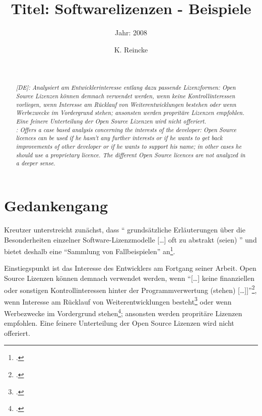 \documentclass[DIV=calc,BCOR=5mm,11pt,headings=small,oneside,abstract=true, toc=bib]{scrartcl}
\begin{document}

\titlehead{Literaturexzerpt}
\subject{Autor(en): Kreutzer}
\title{Titel: Softwarelizenzen - Beispiele}
\subtitle{Jahr: 2008 }
\author{K. Reincke}
\maketitle

\begin{abstract}
\noindent
\cite[(in:)][]{DjoGehGraKreSpi2008a} \\
\noindent
\cite[(ist:)][176 - 179]{Kreutzer2008c} \\
\noindent \itshape
[DE]:  Analysiert am Entwicklerinteresse entlang dazu passende Lizenzformen:
Open Source Lizenzen können demnach verwendet werden, wenn keine
Kontrollinteressen vorliegen, wenn Interesse am Rücklauf von
Weiterentwicklungen bestehen oder wenn Werbezwecke im Vordergrund stehen;
ansonsten werden propritäre Lizenzen empfohlen. Eine feinere Unterteilung der
Open Source Lizenzen wird nicht offeriert. \\
\noindent
[EN]: Offers a case based analysis concerning the interests of the developer:
Open Source licences can be used if he hasn't any further interests or if he
wants to get back improvements of other developer or if he wants to support his
name; in other cases he should use a proprietary licence. The different Open
Source licences are not analyzed in a deeper sense.
\end{abstract}
\footnotesize
\normalsize

\section{Gedankengang}

Kreutzer unterstreicht zunächst, dass \enquote{ grundsätzliche Erläuterungen über
die Besonderheiten einzelner Software-Lizenzmodelle [\ldots] oft zu abstrakt
(seien) } und bietet deshalb eine \enquote{Sammlung von
Fallbeispielen} an\footcite[vgl.][176ff]{Kreutzer2008c}.

Einstiegspunkt ist das Interesse des Entwicklers am Fortgang seiner Arbeit. Open
Source Lizenzen können demnach verwendet werden, wenn \enquote{[\ldots] keine
finanziellen oder sonstigen Kontrollinteressen hinter der Programmverwertung
(stehen) [\ldots]]}\footcite[vgl.][176]{Kreutzer2008c}, wenn Interesse am
Rücklauf von Weiterentwicklungen besteht\footcite[vgl.][177]{Kreutzer2008c} oder
wenn Werbezwecke im Vordergrund stehen\footcite[vgl.][178]{Kreutzer2008c};
ansonsten werden propritäre Lizenzen empfohlen. Eine feinere Unterteilung der
Open Source Lizenzen wird nicht offeriert.

\small

\end{document}
